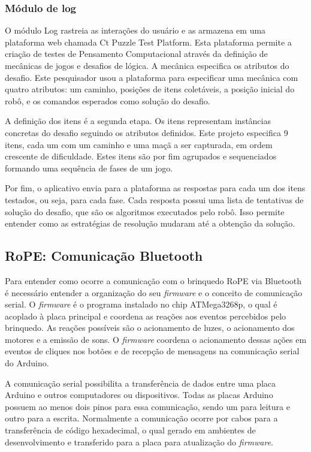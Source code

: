 \subsubsection{Módulo de log}
O módulo Log rastreia as interações do usuário e as armazena em uma plataforma web chamada Ct Puzzle Test Platform. Esta plataforma permite a criação de testes de Pensamento Computacional através da definição de mecânicas de jogos e desafios de lógica. A mecânica especifica os atributos do desafio. Este pesquisador usou a plataforma para especificar uma mecânica com quatro atributos: um caminho, posições de itens coletáveis, a posição inicial do robô, e os comandos esperados como solução do desafio.

A definição dos itens é a segunda etapa. Os itens representam instâncias concretas do desafio seguindo os atributos definidos. Este projeto especifica 9 itens, cada um com um caminho e uma maçã a ser capturada, em ordem crescente de dificuldade. Estes itens são por fim agrupados e sequenciados formando uma sequência de fases de um jogo.

Por fim, o aplicativo envia para a plataforma as respostas para cada um dos itens testados, ou seja, para cada fase. Cada resposta possui uma lista de tentativas de solução do desafio, que são os algoritmos executados pelo robô. Isso permite entender como as estratégias de resolução mudaram até a obtenção da solução.


\subsection{RoPE: Comunicação Bluetooth}
Para entender como ocorre a comunicação com o brinquedo RoPE via Bluetooth é necessário entender a organização do seu \textit{firmware} e o conceito de comunicação serial. O \textit{firmware} é o programa instalado no chip ATMega3268p, o qual é acoplado à placa principal e coordena as reações aos eventos percebidos pelo brinquedo. As reações possíveis são o acionamento de  luzes, o acionamento dos motores e a emissão de sons. O \textit{firmware} coordena o acionamento dessas ações em eventos de cliques nos botões e de recepção de mensagens na comunicação serial do Arduino.

A comunicação serial possibilita a transferência de dados entre uma placa Arduino e outros computadores ou dispositivos. Todas as placas Arduino possuem ao menos dois pinos para essa comunicação, sendo um para leitura e outro para a escrita. Normalmente a comunicação ocorre por cabos para a transferência de código hexadecimal, o qual gerado em ambientes de desenvolvimento e transferido para a placa para atualização do \textit{firmware}.

